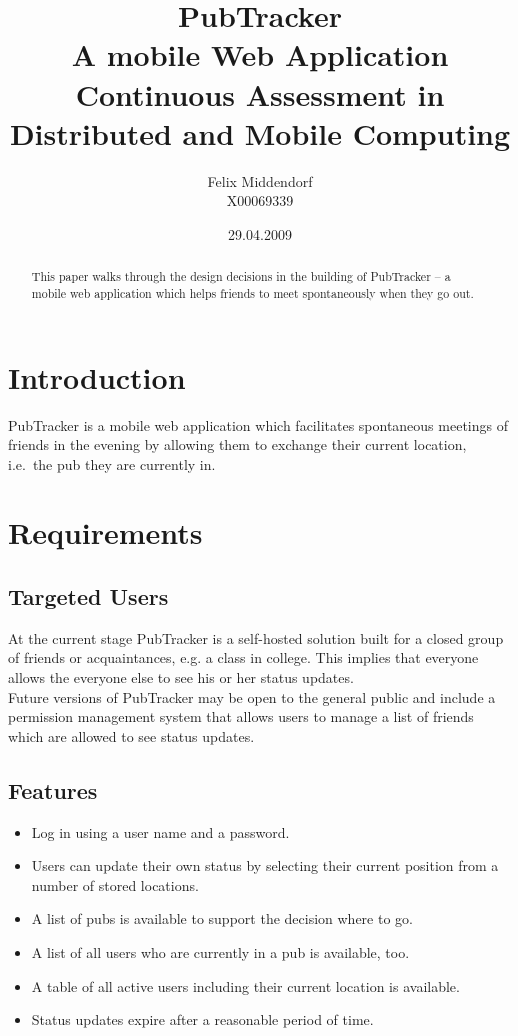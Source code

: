 \documentclass[a4paper,10pt]{scrartcl}
\title{PubTracker\\A mobile Web Application\\{\small Continuous Assessment in Distributed and Mobile Computing}}
\author{Felix Middendorf\\{\small X00069339}}
\date{29.04.2009}
\begin{document}
\maketitle
\begin{abstract}
	This paper walks through the design decisions in the building of PubTracker --
	a mobile web application which helps friends to meet spontaneously when they
	go out.
\end{abstract}
\newpage
\tableofcontents
\newpage

\section{Introduction}
PubTracker is a mobile web application which facilitates spontaneous meetings
of friends in the evening by allowing them to exchange their current location,
i.e.\ the pub they are currently in.

\section{Requirements}
\subsection{Targeted Users}\label{r:user}
At the current stage PubTracker is a self-hosted solution built for a closed
group of friends or acquaintances, e.g. a class in college. This implies that everyone allows the
everyone else to see his or her status updates.\\
Future versions of PubTracker may be open to the general public and include a
permission management system that allows users to manage a list of friends
which are allowed to see status updates.

\subsection{Features}
\begin{itemize}
  \item Log in using a user name and a password.
  \item Users can update their own status by selecting their current position
  from a number of stored locations.
  \item A list of pubs is available to support the decision where to go.
  \item A list of all users who are currently in a pub is available, too.
  \item A table of all active users including their current location is
  available.
  \item Status updates expire after a reasonable period of time.
\end{itemize}
\end{document}
